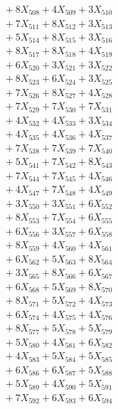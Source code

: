 \documentclass[a4paper,10pt]{article}
\begin{document}
{\begin{align}
&\;  + 8 X_{508} + 4 X_{509} + 3 X_{510} \\[0.3ex]
&\;  + 7 X_{511} + 8 X_{512} + 3 X_{513} \\[0.3ex]
&\;  + 5 X_{514} + 8 X_{515} + 3 X_{516} \\[0.3ex]
&\;  + 8 X_{517} + 8 X_{518} + 4 X_{519} \\[0.5ex]\allowbreak
&\;  + 6 X_{520} + 3 X_{521} + 3 X_{522} \\[0.3ex]
&\;  + 8 X_{523} + 6 X_{524} + 3 X_{525} \\[0.3ex]
&\;  + 7 X_{526} + 8 X_{527} + 4 X_{528} \\[0.3ex]
&\;  + 7 X_{529} + 7 X_{530} + 7 X_{531} \\[0.3ex]
&\;  + 4 X_{532} + 4 X_{533} + 3 X_{534} \\[0.3ex]
&\;  + 4 X_{535} + 4 X_{536} + 4 X_{537} \\[0.3ex]
&\;  + 7 X_{538} + 7 X_{539} + 7 X_{540} \\[0.3ex]
&\;  + 5 X_{541} + 7 X_{542} + 8 X_{543} \\[0.3ex]
&\;  + 7 X_{544} + 7 X_{545} + 4 X_{546} \\[0.3ex]
&\;  + 4 X_{547} + 7 X_{548} + 4 X_{549} \\[0.5ex]\allowbreak
&\;  + 3 X_{550} + 3 X_{551} + 6 X_{552} \\[0.3ex]
&\;  + 8 X_{553} + 7 X_{554} + 6 X_{555} \\[0.3ex]
&\;  + 6 X_{556} + 3 X_{557} + 6 X_{558} \\[0.3ex]
&\;  + 8 X_{559} + 4 X_{560} + 4 X_{561} \\[0.3ex]
&\;  + 6 X_{562} + 5 X_{563} + 8 X_{564} \\[0.3ex]
&\;  + 3 X_{565} + 8 X_{566} + 6 X_{567} \\[0.3ex]
&\;  + 6 X_{568} + 5 X_{569} + 8 X_{570} \\[0.3ex]
&\;  + 8 X_{571} + 5 X_{572} + 4 X_{573} \\[0.3ex]
&\;  + 6 X_{574} + 4 X_{575} + 4 X_{576} \\[0.3ex]
&\;  + 8 X_{577} + 5 X_{578} + 5 X_{579} \\[0.5ex]\allowbreak
&\;  + 5 X_{580} + 4 X_{581} + 6 X_{582} \\[0.3ex]
&\;  + 4 X_{583} + 5 X_{584} + 5 X_{585} \\[0.3ex]
&\;  + 6 X_{586} + 6 X_{587} + 5 X_{588} \\[0.3ex]
&\;  + 5 X_{589} + 4 X_{590} + 5 X_{591} \\[0.3ex]
&\;  + 7 X_{592} + 6 X_{593} + 6 X_{594} \\[0.3ex]

\end{align}}
\end{document}

